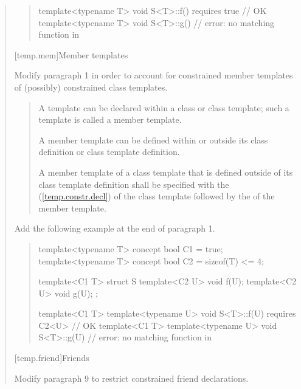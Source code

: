 \begin{quote}
\begin{quote}
\begin{addedblock}
\begin{codeblock}
template<typename T> 
  void S<T>::f() requires true { } // OK
template<typename T> 
  void S<T>::g() { }               // error: no matching function in 
\end{codeblock}
\exitexample
\end{addedblock}
\end{quote}


[temp.mem]{Member templates}


Modify paragraph 1 in order to account for constrained member templates
of (possibly) constrained class templates. 

\begin{quote}
A template can be declared within a class or class template; such a 
template is called a member template. 

A member template can be defined within or outside its class definition 
or class template definition. 

A member template of a class template that is defined outside of its 
class template definition shall be specified with the 
 
(\ref{temp.constr.decl}) of the class template followed by the 
 of the member template.
\end{quote}


Add the following example at the end of paragraph 1.

\begin{quote}
\begin{addedblock}
\enterexample
\begin{codeblock}
template<typename T> concept bool C1 = true;
template<typename T> concept bool C2 = sizeof(T) <= 4;

template<C1 T>
  struct S {
    template<C2 U> void f(U);
    template<C2 U> void g(U);
  };

template<C1 T> template<typename U> 
  void S<T>::f(U) requires C2<U> { } // OK
template<C1 T> template<typename U> 
  void S<T>::g(U) { }                // error: no matching function in 
\end{codeblock}
\exitexample
\end{addedblock}
\end{quote}


\setcounter{subsection}{3}
[temp.friend]{Friends}

Modify paragraph 9 to restrict constrained friend declarations.


\end{quote}
